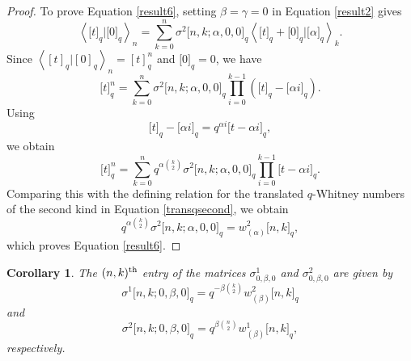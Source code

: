 \documentclass[12pt]{article}
\newtheorem{cor}[thm]{Corollary}
\begin{document}
\begin{proof}
	To prove Equation \eqref{result6}, setting $\beta=\gamma=0$ in Equation \eqref{result2} gives
	\begin{equation*}
		\left\langle\big[t\big]_q|\big[0\big]_q\right\rangle_n=\sum_{k=0}^{n}\sigma^2\big[n,k;\alpha,0,0\big]_q\left\langle\big[t\big]_q+\big[0\big]_q\big|\big[\alpha\big]_q\right\rangle_k.
	\end{equation*}
	Since
	$\left\langle [t]_q|[0]_q\right\rangle_n=[t]_q^n$
	and
	$\big[0\big]_q=0$, we have
	\begin{equation*}
		\big[t\big]_q^n=\sum_{k=0}^{n}\sigma^2\big[n,k;\alpha,0,0\big]_q\prod_{i=0}^{k-1}\left(\big[t\big]_q-\big[\alpha i\big]_q\right).
	\end{equation*}
	Using
	$$ \big[t\big]_q-\big[\alpha i\big]_q=q^{\alpha i}\big[t-\alpha i\big]_q,$$
	we obtain
	\begin{equation*}
		\big[t\big]_q^n=\sum_{k=0}^{n}q^{\alpha\binom{k}{2}}\sigma^2\big[n,k;\alpha,0,0\big]_q\prod_{i=0}^{k-1}\big[t-\alpha i\big]_q.
	\end{equation*}
	Comparing this with the defining relation for the translated $q$-Whitney numbers of the second kind in Equation \eqref{transqsecond}, we obtain
	\begin{equation*}
		q^{\alpha\binom{k}{2}}\sigma^2\big[n,k;\alpha,0,0\big]_q=w^2_{(\alpha)}\big[n,k\big]_q,
	\end{equation*}
	which proves Equation \eqref{result6}.
\end{proof}

\begin{cor}\label{thm4}
	The $(n,k)^{\rm th}$ entry of the matrices $\sigma^1_{0,\beta,0}$ and $\sigma^2_{0,\beta,0}$ are given by
	\begin{equation}
	\sigma^1\big[n,k;0,\beta,0\big]_q=q^{-\beta\binom{k}{2}}w_{(\beta)}^{2}\big[n,k\big]_q\label{result7}
	\end{equation}
	and
	\begin{equation}
	\sigma^2\big[n,k;0,\beta,0\big]_q=q^{\beta\binom{n}{2}}w_{(\beta)}^{1}\big[n,k\big]_q,\label{result8}
	\end{equation}
	respectively.
\end{cor}
\end{document}

